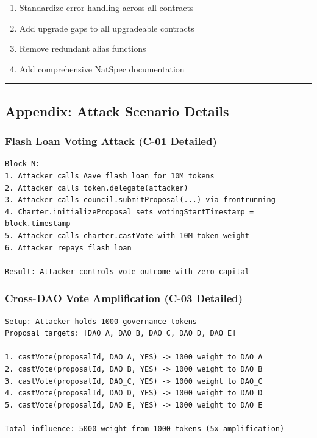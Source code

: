 \documentclass[
]{article}
\providecommand{\tightlist}{%
  \setlength{\itemsep}{0pt}\setlength{\parskip}{0pt}}
\begin{document}
\begin{enumerate}
\def\labelenumi{\arabic{enumi}.}
\setcounter{enumi}{9}
\tightlist
\item
  Standardize error handling across all contracts
\item
  Add upgrade gaps to all upgradeable contracts
\item
  Remove redundant alias functions
\item
  Add comprehensive NatSpec documentation
\end{enumerate}

\begin{center}\rule{0.5\linewidth}{0.5pt}\end{center}

\subsection{Appendix: Attack Scenario
Details}\label{appendix-attack-scenario-details}

\subsubsection{Flash Loan Voting Attack (C-01
Detailed)}\label{flash-loan-voting-attack-c-01-detailed}

\begin{verbatim}
Block N:
1. Attacker calls Aave flash loan for 10M tokens
2. Attacker calls token.delegate(attacker)
3. Attacker calls council.submitProposal(...) via frontrunning
4. Charter.initializeProposal sets votingStartTimestamp = block.timestamp
5. Attacker calls charter.castVote with 10M token weight
6. Attacker repays flash loan

Result: Attacker controls vote outcome with zero capital
\end{verbatim}

\subsubsection{Cross-DAO Vote Amplification (C-03
Detailed)}\label{cross-dao-vote-amplification-c-03-detailed}

\begin{verbatim}
Setup: Attacker holds 1000 governance tokens
Proposal targets: [DAO_A, DAO_B, DAO_C, DAO_D, DAO_E]

1. castVote(proposalId, DAO_A, YES) -> 1000 weight to DAO_A
2. castVote(proposalId, DAO_B, YES) -> 1000 weight to DAO_B
3. castVote(proposalId, DAO_C, YES) -> 1000 weight to DAO_C
4. castVote(proposalId, DAO_D, YES) -> 1000 weight to DAO_D
5. castVote(proposalId, DAO_E, YES) -> 1000 weight to DAO_E

Total influence: 5000 weight from 1000 tokens (5x amplification)
\end{verbatim}
\end{document}
